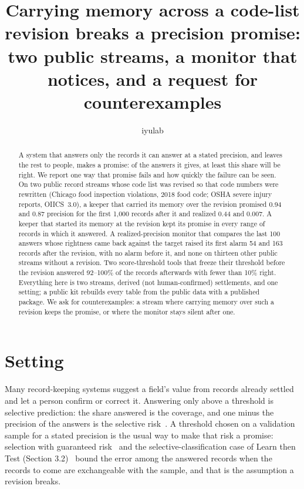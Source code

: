 \documentclass[11pt]{article}
\title{Carrying memory across a code-list revision breaks a precision promise:\\
two public streams, a monitor that notices, and a request for counterexamples}
\author{iyulab}
\date{}
\begin{document}
\maketitle

\begin{abstract}
A system that answers only the records it can answer at a stated precision, and leaves the rest to people, makes a
promise: of the answers it gives, at least this share will be right. We report one way that promise fails and how
quickly the failure can be seen. On two public record streams whose code list was revised so that code numbers were
rewritten (Chicago food inspection violations, 2018 food code; OSHA severe injury reports, OIICS~3.0), a keeper that
carried its memory over the revision promised 0.94 and 0.87 precision for the first 1{,}000 records after it and
realized 0.44 and 0.007. A keeper that started its memory at the revision kept its promise in every range of records in
which it answered. A realized-precision monitor that compares the last 100 answers whose rightness came back against the target raised its
first alarm 54 and 163 records after the revision, with no alarm before it, and none on thirteen other public streams
without a revision. Two score-threshold tools that freeze their threshold before the revision answered 92--100\% of the
records afterwards with fewer than 10\% right. Everything here is two streams, derived (not human-confirmed)
settlements, and one setting; a public kit rebuilds every table from the public data with a published package. We ask
for counterexamples: a stream where carrying memory over such a revision keeps the promise, or where the monitor stays
silent after one.
\end{abstract}

\section{Setting}

Many record-keeping systems suggest a field's value from records already settled and let a person confirm or correct
it. Answering only above a threshold is selective prediction: the share answered is the coverage, and one minus the
precision of the answers is the selective risk~\cite{geifman2017}. A threshold chosen on a validation sample for a
stated precision is the usual way to make that risk a promise: selection with guaranteed risk~\cite{geifman2017} and
the selective-classification case of Learn then Test (Section 3.2)~\cite{ltt} bound the error among the answered records
when the records to come are exchangeable with the sample, and that is the assumption a revision breaks.
\end{document}
